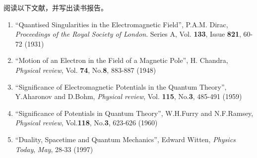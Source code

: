 阅读以下文献，并写出读书报告。

\begin{enumerate}
    \item ``Quantised Singularities in the Electromagnetic Field'', P.A.M. Dirac, \emph{Proceedings of the Royal Society of London}. Series A, Vol. \textbf{133}, Issue \textbf{821}, 60-72 (1931)
    \item ``Motion of an Electron in the Field of a Magnetic Pole'', H. Chandra, \emph{Physical review}, Vol. \textbf{74}, No.\textbf{8}, 883-887 (1948)
    \item ``Significance of Electromagnetic Potentials in the Quantum Theory'', Y.Aharonov and D.Bohm, \emph{Physical review}, Vol. \textbf{115}, No.\textbf{3}, 485-491 (1959)
    \item ``Significance of Potentials in Quantum Theory'', W.H.Furry and N.F.Ramsey, \emph{Physical review}, Vol.\textbf{118}, No.\textbf{3}, 623-626 (1960)
    \item ``Duality, Spacetime and Quantum Mechanics'', Edward Witten, \emph{Physics Today}, \emph{May}, 28-33 (1997)
\end{enumerate}
